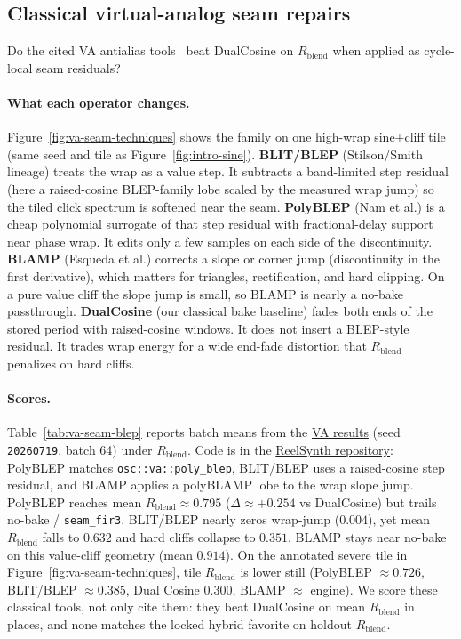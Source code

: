 \subsection{Classical virtual-analog seam repairs}
\label{sec:va-seam-baselines}

Do the cited VA antialias tools~\cite{stilson1996,nam2009polyblep,esqueda2016blamp} beat DualCosine on $R_{\mathrm{blend}}$ when applied as cycle-local seam residuals?

\paragraph{What each operator changes.}
Figure~\ref{fig:va-seam-techniques} shows the family on one high-wrap sine{+}cliff tile (same seed and tile as Figure~\ref{fig:intro-sine}).
\textbf{BLIT/BLEP} (Stilson/Smith lineage) treats the wrap as a value step.
It subtracts a band-limited step residual (here a raised-cosine BLEP-family lobe scaled by the measured wrap jump) so the tiled click spectrum is softened near the seam.
\textbf{PolyBLEP} (Nam et al.) is a cheap polynomial surrogate of that step residual with fractional-delay support near phase wrap.
It edits only a few samples on each side of the discontinuity.
\textbf{BLAMP} (Esqueda et al.) corrects a slope or corner jump (discontinuity in the first derivative), which matters for triangles, rectification, and hard clipping.
On a pure value cliff the slope jump is small, so BLAMP is nearly a no-bake passthrough.
\textbf{DualCosine} (our classical bake baseline) fades both ends of the stored period with raised-cosine windows.
It does not insert a BLEP-style residual.
It trades wrap energy for a wide end-fade distortion that $R_{\mathrm{blend}}$ penalizes on hard cliffs.

\paragraph{Scores.}
Table~\ref{tab:va-seam-blep} reports batch means from the \href{https://github.com/reeldemo/denoise-opt-meta/blob/master/paper/Unsupervised_Wrap-Discontinuity_Repair_in_Wavetable_Synthesis_via_Hybrid_GA-PPO_Meta-Search_v12/figures/va_seam_blep.json}{VA results} (seed \texttt{20260719}, batch 64) under $R_{\mathrm{blend}}$.
Code is in the \href{https://github.com/reeldemo/reelsynth}{ReelSynth repository}: PolyBLEP matches \texttt{osc::va::poly\_blep}, BLIT/BLEP uses a raised-cosine step residual, and BLAMP applies a polyBLAMP lobe to the wrap slope jump.
PolyBLEP reaches mean $R_{\mathrm{blend}}\approx 0.795$ ($\Delta\approx{+}0.254$ vs DualCosine) but trails no-bake / \texttt{seam\_fir3}.
BLIT/BLEP nearly zeros wrap-jump ($0.004$), yet mean $R_{\mathrm{blend}}$ falls to $0.632$ and hard cliffs collapse to $0.351$.
BLAMP stays near no-bake on this value-cliff geometry (mean $0.914$).
On the annotated severe tile in Figure~\ref{fig:va-seam-techniques}, tile $R_{\mathrm{blend}}$ is lower still (PolyBLEP $\approx 0.726$, BLIT/BLEP $\approx 0.385$, Dual Cosine $0.300$, BLAMP $\approx$ engine).
We score these classical tools, not only cite them: they beat DualCosine on mean $R_{\mathrm{blend}}$ in places, and none matches the locked hybrid favorite on holdout $R_{\mathrm{blend}}$.

